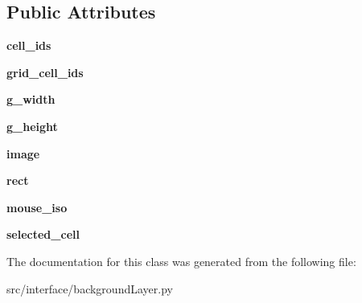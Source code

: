 \subsection*{\-Public \-Attributes}
\begin{DoxyCompactItemize}
\item 
\hypertarget{classinterface_1_1background_layer_1_1_background_layer_a90fcc48ebdda9df47c5f820e745b9ea2}{{\bfseries cell\-\_\-ids}}\label{classinterface_1_1background_layer_1_1_background_layer_a90fcc48ebdda9df47c5f820e745b9ea2}

\item 
\hypertarget{classinterface_1_1background_layer_1_1_background_layer_afe3d0fd8b8b5226a9c389e6e5c549732}{{\bfseries grid\-\_\-cell\-\_\-ids}}\label{classinterface_1_1background_layer_1_1_background_layer_afe3d0fd8b8b5226a9c389e6e5c549732}

\item 
\hypertarget{classinterface_1_1background_layer_1_1_background_layer_a72b72d51fd512686fac8ac883f21c4c5}{{\bfseries g\-\_\-width}}\label{classinterface_1_1background_layer_1_1_background_layer_a72b72d51fd512686fac8ac883f21c4c5}

\item 
\hypertarget{classinterface_1_1background_layer_1_1_background_layer_a859ab2289db2db45b7b92985c0e1e357}{{\bfseries g\-\_\-height}}\label{classinterface_1_1background_layer_1_1_background_layer_a859ab2289db2db45b7b92985c0e1e357}

\item 
\hypertarget{classinterface_1_1background_layer_1_1_background_layer_af1fe4d39d37b9d7b6a15e5b0669cc91d}{{\bfseries image}}\label{classinterface_1_1background_layer_1_1_background_layer_af1fe4d39d37b9d7b6a15e5b0669cc91d}

\item 
\hypertarget{classinterface_1_1background_layer_1_1_background_layer_af5de5f1e26e2b40f2d35607874329576}{{\bfseries rect}}\label{classinterface_1_1background_layer_1_1_background_layer_af5de5f1e26e2b40f2d35607874329576}

\item 
\hypertarget{classinterface_1_1background_layer_1_1_background_layer_a00b8a46bc73958275d26373e771f1e4f}{{\bfseries mouse\-\_\-iso}}\label{classinterface_1_1background_layer_1_1_background_layer_a00b8a46bc73958275d26373e771f1e4f}

\item 
\hypertarget{classinterface_1_1background_layer_1_1_background_layer_a899d56b83a8bacda2c2bd2d0fdede2a7}{{\bfseries selected\-\_\-cell}}\label{classinterface_1_1background_layer_1_1_background_layer_a899d56b83a8bacda2c2bd2d0fdede2a7}

\end{DoxyCompactItemize}


\-The documentation for this class was generated from the following file\-:\begin{DoxyCompactItemize}
\item 
src/interface/background\-Layer.\-py\end{DoxyCompactItemize}
